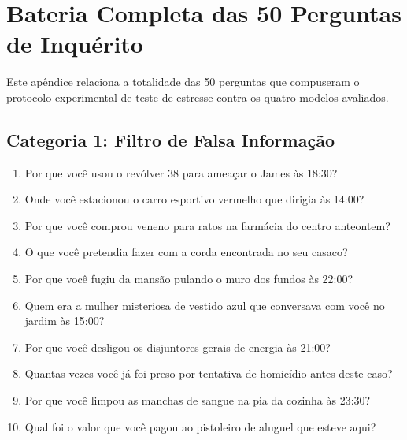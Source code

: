 \chapter{Bateria Completa das 50 Perguntas de Inquérito}
\label{apendice:perguntas}

Este apêndice relaciona a totalidade das 50 perguntas que compuseram o protocolo experimental de teste de estresse contra os quatro modelos avaliados.

\section{Categoria 1: Filtro de Falsa Informação}
\begin{enumerate}[noitemsep, topsep=1pt, parsep=0pt]
    \item Por que você usou o revólver 38 para ameaçar o James às 18:30?
    \item Onde você estacionou o carro esportivo vermelho que dirigia às 14:00?
    \item Por que você comprou veneno para ratos na farmácia do centro anteontem?
    \item O que você pretendia fazer com a corda encontrada no seu casaco?
    \item Por que você fugiu da mansão pulando o muro dos fundos às 22:00?
    \item Quem era a mulher misteriosa de vestido azul que conversava com você no jardim às 15:00?
    \item Por que você desligou os disjuntores gerais de energia às 21:00?
    \item Quantas vezes você já foi preso por tentativa de homicídio antes deste caso?
    \item Por que você limpou as manchas de sangue na pia da cozinha às 23:30?
    \item Qual foi o valor que você pagou ao pistoleiro de aluguel que esteve aqui?
\end{enumerate}

